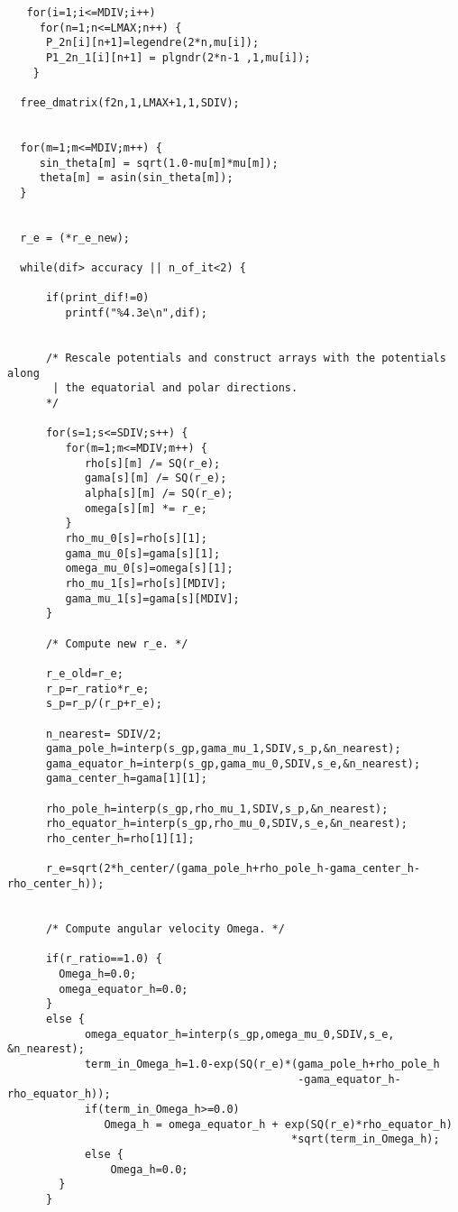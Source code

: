 \begin{verbatim}
   for(i=1;i<=MDIV;i++)
     for(n=1;n<=LMAX;n++) {
      P_2n[i][n+1]=legendre(2*n,mu[i]);
      P1_2n_1[i][n+1] = plgndr(2*n-1 ,1,mu[i]);
    }

  free_dmatrix(f2n,1,LMAX+1,1,SDIV);


  for(m=1;m<=MDIV;m++) { 
     sin_theta[m] = sqrt(1.0-mu[m]*mu[m]);  
     theta[m] = asin(sin_theta[m]);
  }

  
  r_e = (*r_e_new);

  while(dif> accuracy || n_of_it<2) { 

      if(print_dif!=0)
         printf("%4.3e\n",dif);

 
      /* Rescale potentials and construct arrays with the potentials along
       | the equatorial and polar directions.
      */        

      for(s=1;s<=SDIV;s++) {
         for(m=1;m<=MDIV;m++) {
            rho[s][m] /= SQ(r_e);
            gama[s][m] /= SQ(r_e); 
            alpha[s][m] /= SQ(r_e);
            omega[s][m] *= r_e;
         }
         rho_mu_0[s]=rho[s][1];     
         gama_mu_0[s]=gama[s][1];   
         omega_mu_0[s]=omega[s][1]; 
         rho_mu_1[s]=rho[s][MDIV];  
         gama_mu_1[s]=gama[s][MDIV];
      }
 
      /* Compute new r_e. */ 

      r_e_old=r_e;
      r_p=r_ratio*r_e;                          
      s_p=r_p/(r_p+r_e);                        
  
      n_nearest= SDIV/2;
      gama_pole_h=interp(s_gp,gama_mu_1,SDIV,s_p,&n_nearest); 
      gama_equator_h=interp(s_gp,gama_mu_0,SDIV,s_e,&n_nearest);
      gama_center_h=gama[1][1];                    
  
      rho_pole_h=interp(s_gp,rho_mu_1,SDIV,s_p,&n_nearest);   
      rho_equator_h=interp(s_gp,rho_mu_0,SDIV,s_e,&n_nearest);
      rho_center_h=rho[1][1];                      
 
      r_e=sqrt(2*h_center/(gama_pole_h+rho_pole_h-gama_center_h-rho_center_h));


      /* Compute angular velocity Omega. */
 
      if(r_ratio==1.0) {
        Omega_h=0.0;
        omega_equator_h=0.0;
      } 
      else {
            omega_equator_h=interp(s_gp,omega_mu_0,SDIV,s_e, &n_nearest);
            term_in_Omega_h=1.0-exp(SQ(r_e)*(gama_pole_h+rho_pole_h
                                             -gama_equator_h-rho_equator_h));
            if(term_in_Omega_h>=0.0) 
               Omega_h = omega_equator_h + exp(SQ(r_e)*rho_equator_h)
                                            *sqrt(term_in_Omega_h);
            else {
                Omega_h=0.0;
	    }
      }
 


\end{verbatim}
